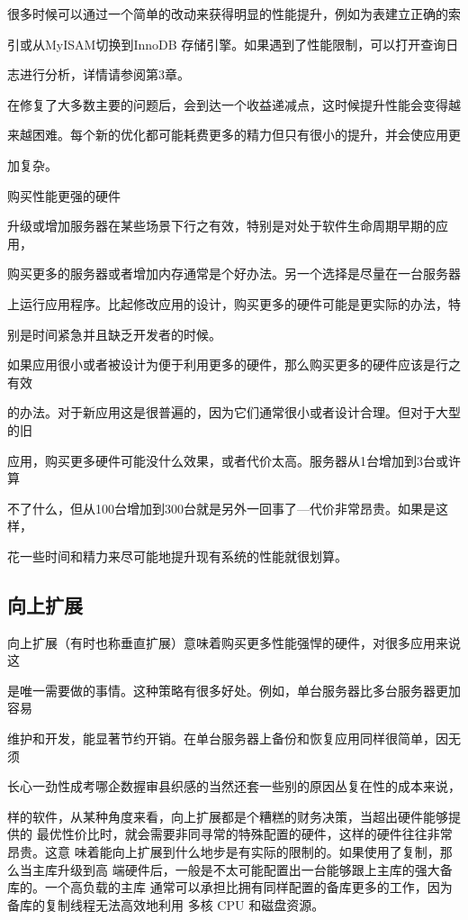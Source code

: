 很多时候可以通过一个简单的改动来获得明显的性能提升，例如为表建立正确的索

引或从MyISAM切换到InnoDB 存储引擎。如果遇到了性能限制，可以打开查询日

志进行分析，详情请参阅第3章。

在修复了大多数主要的问题后，会到达一个收益递减点，这时候提升性能会变得越

来越困难。每个新的优化都可能耗费更多的精力但只有很小的提升，并会使应用更

加复杂。

购买性能更强的硬件

升级或增加服务器在某些场景下行之有效，特别是对处于软件生命周期早期的应用，

购买更多的服务器或者增加内存通常是个好办法。另一个选择是尽量在一台服务器

上运行应用程序。比起修改应用的设计，购买更多的硬件可能是更实际的办法，特

别是时间紧急并且缺乏开发者的时候。

如果应用很小或者被设计为便于利用更多的硬件，那么购买更多的硬件应该是行之有效

的办法。对于新应用这是很普遍的，因为它们通常很小或者设计合理。但对于大型的旧

应用，购买更多硬件可能没什么效果，或者代价太高。服务器从1台增加到3台或许算

不了什么，但从100台增加到300台就是另外一回事了—代价非常昂贵。如果是这样，

花一些时间和精力来尽可能地提升现有系统的性能就很划算。

\subsection{向上扩展}
向上扩展（有时也称垂直扩展）意味着购买更多性能强悍的硬件，对很多应用来说这

是唯一需要做的事情。这种策略有很多好处。例如，单台服务器比多台服务器更加容易

维护和开发，能显著节约开销。在单台服务器上备份和恢复应用同样很简单，因无须

长心一劲性成考哪企数握审县织感的当然还套一些别的原因丛复在性的成本来说，

样的软件，从某种角度来看，向上扩展都是个糟糕的财务决策，当超出硬件能够提供的
最优性价比时，就会需要非同寻常的特殊配置的硬件，这样的硬件往往非常昂贵。这意
味着能向上扩展到什么地步是有实际的限制的。如果使用了复制，那么当主库升级到高
端硬件后，一般是不太可能配置出一台能够跟上主库的强大备库的。一个高负载的主库
通常可以承担比拥有同样配置的备库更多的工作，因为备库的复制线程无法高效地利用
多核 CPU 和磁盘资源。

